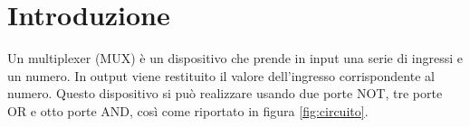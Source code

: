 \section{Introduzione}\label{sec:textscopo}
Un multiplexer (MUX) è un dispositivo che prende in input una serie di ingressi e un numero. In output viene restituito il valore dell'ingresso corrispondente al numero.
Questo dispositivo si può realizzare usando due porte NOT, tre porte OR e otto porte AND, così come
riportato in figura \ref{fig:circuito}.
